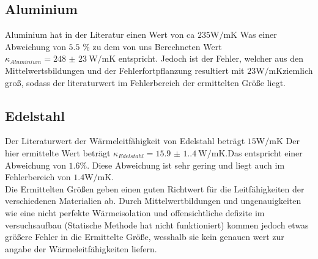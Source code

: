 \subsection{Aluminium}
\noindent Aluminium hat in der Literatur einen Wert von ca $235 \unit{\watt\per\meter\kelvin}$ 
Was einer Abweichung von $5.5$ \% zu dem von uns Berechneten Wert $\kappa_{Aluminium} = \qty{248(23)}{\watt\per\meter\kelvin}$ 
entspricht. Jedoch ist der Fehler, welcher aus den Mittelwertsbildungen und der
Fehlerfortpflanzung resultiert mit $ 23 \unit{\watt\per\meter\kelvin}$ziemlich groß, sodass der literaturwert 
im Fehlerbereich der ermittelten Größe liegt. 
\subsection{Edelstahl}
\noindent Der Literaturwert der Wärmeleitfähigkeit von Edelstahl beträgt $15 \unit{\watt\per\meter\kelvin}$
Der hier ermittelte Wert beträgt $\kappa_{Edelstahl} = \qty{15.9(1.4)}{\watt\per\meter\kelvin}$.Das entspricht einer 
Abweichung von $1.6 \% $. Diese Abweichung ist sehr gering und liegt auch im Fehlerbereich von $1.4 \unit{\watt\per\meter\kelvin}$.\\[0.2cm]

\noindent Die Ermittelten Größen geben einen guten Richtwert für die Leitfähigkeiten der verschiedenen Materialien ab.
Durch Mittelwertbildungen und ungenauigkeiten wie eine nicht perfekte Wärmeisolation und offensichtliche defizite im 
versuchsaufbau (Statische Methode hat nicht funktioniert) kommen jedoch etwas größere Fehler 
in die Ermittelte Größe, wesshalb sie kein genauen wert zur angabe der Wärmeleitfähigkeiten liefern.